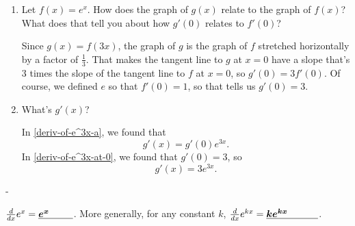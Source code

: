 \documentclass{article}
\makeatletter
\newlength{\tipmargin}
\renewenvironment{framed}{
  \setlength{\tipmargin}{\textwidth-\linewidth}
  \advance\@totalleftmargin-\tipmargin
  \def\FrameCommand{\hspace{\tipmargin}\fbox}%
  \advance\linewidth\tipmargin
  \MakeFramed {\advance\hsize-\width \FrameRestore}%
}
{\endMakeFramed}
\makeatother
\begin{document}
\begin{enumerate}[resume]
\begin{enumerate}
    \begin{solution}
      $\left( e^{3x} \right) = \left( e^3 \right)^x$. Since $g(x)$ can be written as $g(x) = b^x$, we know that $g'(x) = g'(0) b^x = g'(0) \left( e^3 \right)^x = g'(0) e^{3x}$. 
    \end{solution}

  \item \label{deriv-of-e^3x-at-0}
    \begin{problem}[\stretch{1.25}]
      Let $f(x) = e^x$. How does the graph of $g(x)$ relate to the graph of $f(x)$? What does that tell you about how $g'(0)$ relates to $f'(0)$?
    \end{problem}

    \begin{solution}
      Since $g(x) = f(3x)$, the graph of $g$ is the graph of $f$ stretched horizontally by a factor of $\frac{1}{3}$. That makes the tangent line to $g$ at $x = 0$ have a slope that's 3 times the slope of the tangent line to $f$ at $x = 0$, so $g'(0) = 3 f'(0)$. Of course, we defined $e$ so that $f'(0) = 1$, so that tells us $g'(0) = 3$.
    \end{solution}

  \item
    \begin{problem}[\newpage]
      What's $g'(x)$?
    \end{problem}

    \begin{solution}
      In \ref{deriv-of-e^3x-a}, we found that \[g'(x) = g'(0) e^{3x}.\] In \ref{deriv-of-e^3x-at-0}, we found that $g'(0) = 3$, so
      \[ g'(x) = 3 e^{3x}.\]
    \end{solution}

  \end{enumerate}

\end{enumerate}
\begin{framed}
  \smallskip

  $\frac{d}{dx} e^x = \fitb{0.5in}{e^x}$.  More generally, for any
  constant $k$, $\frac{d}{dx} e^{kx} = \fitb{0.75in}{ke^{kx}}$.
\end{framed}
\end{document}
